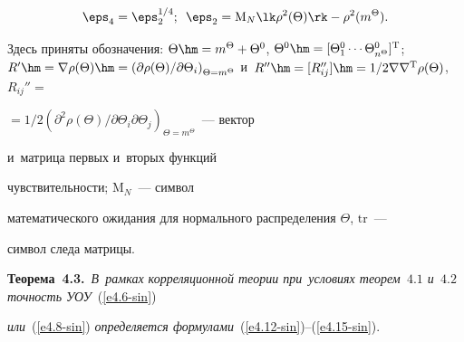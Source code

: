 \vspace*{-9pt}



\noindent

\begin{equation}

    \eps_4 = \eps_2^{1/4};\enskip \eps_2 =\mathrm{M}_N \lk \rho^2 (\Theta)\rk-\rho^2 

(m^\Theta).\label{e4.15-sin}

\end{equation}

Здесь приняты  обозначения: $\Theta\hm=m^\Theta+\Theta^0$, $\Theta^0\hm=[ 

\Theta_1^0\cdots \Theta_{n^\Theta}^0]^{\mathrm{T}}$; $R'\hm=\nabla \rho(\Theta)\hm = \left( 

\partial \rho(\Theta)/ \partial \Theta_i \right)_{\Theta=m^\Theta}$ и~$R'' \hm= [ 

R_{ij}''] \hm= 1/2\nabla \nabla^{\mathrm{T}} \rho(\Theta)$, $R_{ij}'' =$\linebreak\vspace*{-1pt}

$=1/2 \left( \partial^2 

\rho(\Theta)/ \partial \Theta_i \partial \Theta_j\right)_{\Theta=m^\Theta}$~--- вектор 

и~матрица первых и~вторых функций\linebreak\vspace*{-12pt}



\pagebreak



\noindent

 чувствительности; $\mathrm{M}_N$~--- символ 

математического ожидания для нормального распределения $\Theta$, $\mathrm{tr}$~--- 

символ следа матрицы.





\smallskip



\noindent

\textbf{Теорема~4.3.}\ \textit{В~рамках корреляционной тео\-рии при~условиях тео\-рем~$4.1$  и~$4.2$ точ\-ность УОУ}~(\ref{e4.6-sin}) 

\textit{или}~(\ref{e4.8-sin}) \textit{определяется формулами}~(\ref{e4.12-sin})--(\ref{e4.15-sin}).





